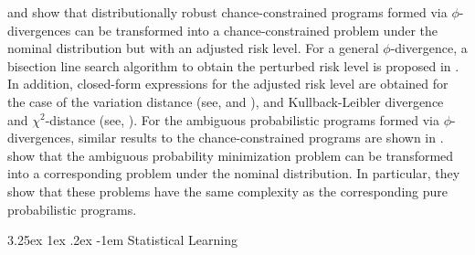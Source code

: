 \documentclass[final,onefignum,onetabnum]{class}
\makeatletter
\renewcommand\paragraph{\@startsection{paragraph}{4}{\z@}%
  {3.25ex \@plus1ex \@minus.2ex}%
  {-1em}%
  {\normalfont\normalsize\bfseries}}
\makeatother
\begin{document}
\citet{hu2013ambiguous} and \citet{jiang2016chance} show that distributionally robust chance-constrained programs formed via $\phi$-divergences  can   be   transformed into a  chance-constrained problem under the nominal distribution but with an adjusted risk level. For a general $\phi$-divergence, a  bisection line search algorithm to obtain the perturbed risk level is proposed in \citet{hu2013ambiguous,jiang2016chance}. In addition, closed-form expressions for the adjusted risk level are obtained for the case of the variation distance (see, \citet{hu2013ambiguous} and \citet{jiang2016chance}), and Kullback-Leibler divergence and $\chi^2$-distance (see, \citet{jiang2016chance}). 
For the ambiguous probabilistic programs formed via $\phi$-divergences,  similar results to the chance-constrained programs are  shown in \citet{hu2013ambiguous}.  \citet{hu2013ambiguous} show that the ambiguous probability minimization problem can be transformed into a corresponding problem under the nominal distribution. %
In particular,
they show that these problems have the same complexity as the corresponding pure probabilistic programs. 

\paragraph{Statistical Learning}
\end{document}
